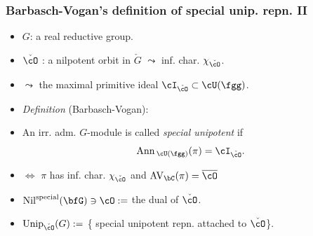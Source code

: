 \documentclass[t,11pt,usenames,dvipsnames]{beamer}
\theoremstyle{plain}
\theoremstyle{definition}
\newcommand{\AV}{\mathrm{AV}}
\def\Ann{{\mathrm{Ann}\,}}
\def\Unip{{\mathrm{Unip}}}
\def\ckcO{{\check{\cO}}}
\def\Nil{\mathrm{Nil}}
\def\blue{\color{blue}}
\let\oldemph\emph
\def\emph#1{\oldemph{\blue #1}}
\def\vG{{\check{G}}}
\begin{document}
    \begin{frame}
      \frametitle{Barbasch-Vogan's definition of  special unip. repn. II}
      \begin{itemize}[<+->]
            \item[] $G$: a real reductive group.
            \item  $\ckcO$ : a nilpotent orbit in $\vG$ $\leadsto$ inf. char. $\chi_{\ckcO}$.
              \vspace{-1.5em}
            \item[] \hspace{1em} $\leadsto$  the maximal primitive ideal
            $\cI_{\ckcO}\subset \cU(\fgg)$. %
              \vspace{-1.5em}
            \item  \emph{Definition} (Barbasch-Vogan):
            \item [] An irr. adm. $G$-module is called
            \emph{special unipotent} if
            \[
            \Ann_{\cU(\fgg)}(\pi) = \cI_{\ckcO}.
            \]
            \item[]
            $\Longleftrightarrow$ $\pi$ has inf. char. $\chi_{\ckcO}$ and
            $\AV_\bC(\pi) = \overline{\cO}$
            \item $\Nil^{\text{special}}(\bfG)\ni \cO:=$
            the 
            dual of $\ckcO$.
            \item $\Unip_{\ckcO}(G):=$ \{ special unipotent repn. attached to $\ckcO$\}.
      \end{itemize}
    \end{frame}
\end{document}
